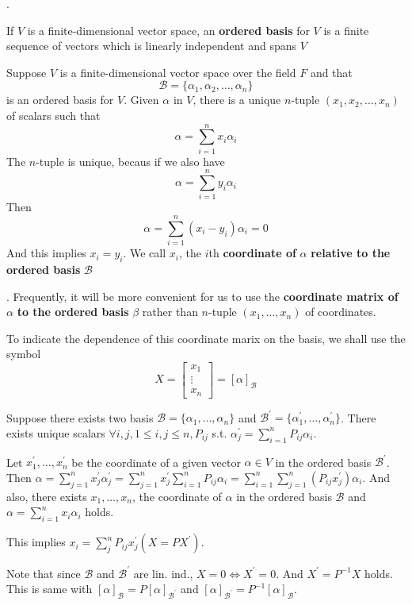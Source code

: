 \documentclass[8pt]{beamer}
\newcommand{\mc}[1]{\mathcal{#1}}
\newcommand{\tb}[1]{\textbf{#1}}
\begin{document}
\begin{frame}{.}
    \begin{definition}
        If $V$ is a finite-dimensional vector space, an \tb{ordered basis} for $V$ is a finite sequence of vectors which is linearly independent and spans $V$
    \end{definition}
    Suppose $V$ is a finite-dimensional vector space over the field $F$ and that 
    \[
    \mc{B} = \{\alpha_1, \alpha_2, \dots, \alpha_n\}
    \]
    is an ordered basis for $V$. Given $\alpha$ in $V$, there is a unique $n$-tuple $(x_1, x_2, \dots, x_n)$ of scalars such that 
    \[
    \alpha = \sum_{i=1}^n x_i \alpha_i
    \]
    The $n$-tuple is unique, becaus if we also have 
    \[
    \alpha = \sum_{i=1}^n y_i \alpha_i
    \]
    Then 
    \[
    \alpha = \sum_{i=1}^n (x_i - y_i)\alpha_i = 0
    \]
    And this implies $x_i = y_i$. We call $x_i$, the $i$th \tb{coordinate of }$\alpha$ \tb{relative to the ordered basis} $\mc{B}$
\end{frame}

\begin{frame}{.}
    Frequently, it will be more convenient for us to use the \tb{coordinate matrix of }$\alpha$ \tb{to the ordered basis }$\beta$ rather than $n$-tuple $(x_1, \dots, x_n)$ of coordinates.

    To indicate the dependence of this coordinate marix on the basis, we shall use the symbol
    \[
    X = \left[\begin{matrix} x_1 \\ \vdots \\ x_n \end{matrix}\right] = [\alpha]_{\mc{B}}
    \]

    \bigskip

    Suppose there exists two basis $\mc{B} = \{\alpha_1, \dots, \alpha_n \}$ and $\mc{B}^\prime = \{\alpha^\prime_1, \dots, \alpha^\prime_n\}$. There exists unique scalars $\forall i, j, 1\leq i,j \leq n, P_{ij}$ s.t. $\alpha^\prime_j = \sum_{i=1}^n P_{ij} \alpha_i$. 
    
    Let $x_1^\prime, \dots, x^\prime_n$ be the coordinate of a given vector $\alpha \in V$ in the ordered basis $\mc{B}^\prime$. Then $\alpha = \sum_{j=1}^n x^\prime_j \alpha^\prime_j = \sum^n_{j=1} x^\prime_j \sum_{i=1}^n P_{ij} \alpha_i = \sum_{i=1}^n \sum_{j=1}^n (P_{ij} x^\prime_j) \alpha_i$. And also, there exists $x_1, \dots, x_n$, the coordinate of $\alpha$ in the ordered basis $\mc{B}$ and $\alpha = \sum_{i=1}^n x_i \alpha_i$ holds.

    This implies $x_i = \sum_{j}^n P_{ij} x^\prime_j (X = PX^\prime)$.
    
    \smallskip

    Note that since $\mc{B}$ and $\mc{B}^\prime$ are lin. ind., $X = 0 \iff X^\prime = 0$.
    And $X^\prime = P^{-1} X$ holds.
    This is same with $[\alpha]_{\mc{B}} = P [\alpha]_{\mc{B}^\prime}$ and $[\alpha]_{\mc{B}^\prime} = P^{-1} [\alpha]_{\mc{B}}$.
\end{frame}
\end{document}
